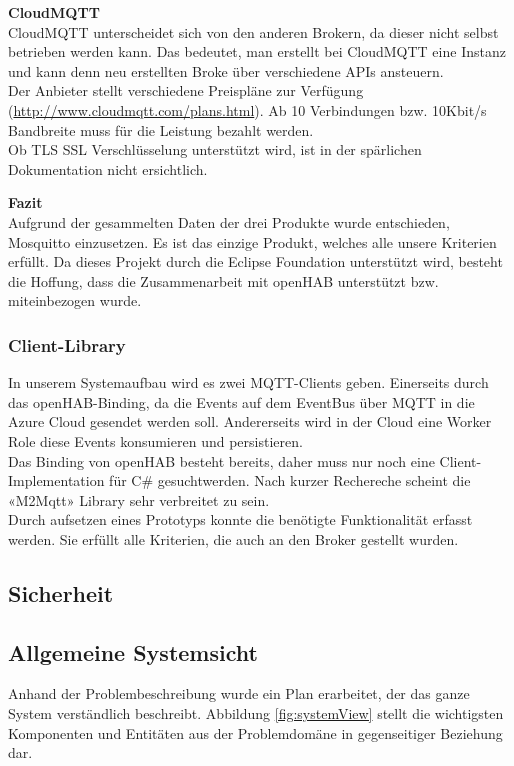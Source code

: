 \textbf{CloudMQTT} \\
CloudMQTT unterscheidet sich von den anderen Brokern, da dieser nicht selbst betrieben werden kann. Das bedeutet, man erstellt bei CloudMQTT eine Instanz und kann denn neu erstellten Broke über verschiedene APIs ansteuern. \\
Der Anbieter stellt verschiedene Preispläne zur Verfügung (\url{http://www.cloudmqtt.com/plans.html}). Ab 10 Verbindungen bzw. 10Kbit/s Bandbreite muss für die Leistung bezahlt werden. \\
Ob TLS SSL Verschlüsselung unterstützt wird, ist in der spärlichen Dokumentation nicht ersichtlich.

\textbf{Fazit} \\
Aufgrund der gesammelten Daten der drei Produkte wurde entschieden, Mosquitto einzusetzen. Es ist das einzige Produkt, welches alle unsere Kriterien erfüllt. Da dieses Projekt durch die Eclipse Foundation unterstützt wird, besteht die Hoffung, dass die Zusammenarbeit mit openHAB unterstützt bzw. miteinbezogen wurde.

\subsubsection{Client-Library}
In unserem Systemaufbau wird es zwei MQTT-Clients geben. Einerseits durch das openHAB-Binding, da die Events auf dem EventBus über MQTT in die Azure Cloud gesendet werden soll. Andererseits wird in der Cloud eine Worker Role diese Events konsumieren und persistieren. \\
Das Binding von openHAB besteht bereits, daher muss nur noch eine Client-Implementation für C\# gesuchtwerden. Nach kurzer Rechereche scheint die «M2Mqtt» Library sehr verbreitet zu sein. \\
Durch aufsetzen eines Prototyps konnte die benötigte Funktionalität erfasst werden. Sie erfüllt alle Kriterien, die auch an den Broker gestellt wurden.

\subsection{Sicherheit}
\tbd

\subsection{Allgemeine Systemsicht}
Anhand der Problembeschreibung wurde ein Plan erarbeitet, der das ganze System verständlich beschreibt. Abbildung \ref{fig:systemView} stellt die wichtigsten Komponenten und Entitäten aus der Problemdomäne in gegenseitiger Beziehung dar.

